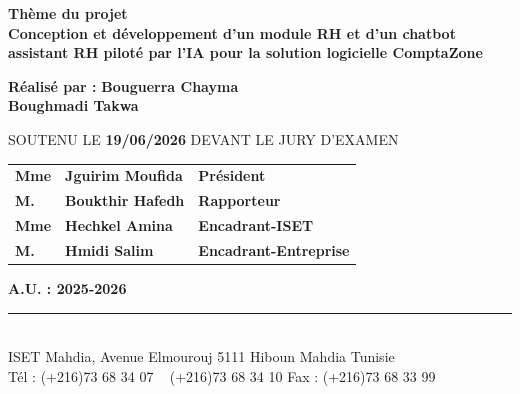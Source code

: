 \documentclass[12pt,a4paper]{report}
\begin{document}
\begin{titlepage}
   \begin{tcolorbox}[
    enhanced,
    width=\textwidth,
    colback=white,
    colframe=black,
    boxrule=0.8pt,
    arc=0pt,
    outer arc=0pt,
    borderline west={4pt}{-4pt}{black!30},
    borderline north={4pt}{-4pt}{black!30},
    left=0.8cm,
    right=0.8cm,
    top=0.4cm,
    bottom=0.4cm,
    halign=center,
]   
    {\fontsize{18}{21}\selectfont\textbf{Thème du projet}}\\[0.2cm]
    {\fontsize{12}{15}\selectfont\textbf{Conception et développement d'un module RH et d'un chatbot assistant RH piloté par l'IA pour la solution logicielle ComptaZone}}
    \end{tcolorbox}
    \vspace{0.1cm}

\begin{flushleft}
    {\fontsize{13}{16}\selectfont\textbf{Réalisé par :}} \hspace{1cm} {\fontsize{13}{16}\selectfont\textbf{Bouguerra Chayma}}\\[0.3cm]
    \hspace{4cm} {\fontsize{13}{16}\selectfont\textbf{Boughmadi Takwa}}
\end{flushleft}

\vspace{0.1cm}

    {\hspace{0.2cm} \fontsize{10}{12.5}\selectfont SOUTENU LE \textbf{19/06/2026} DEVANT LE JURY D'EXAMEN }
    \begin{flushleft}
    \begin{tabular}{@{}p{3cm} p{6.5cm} p{7cm}@{}}
        \fontsize{11}{14}\selectfont \textbf{Mme} & \fontsize{11}{14}\selectfont\textbf{Jguirim Moufida}  & \textbf{Président} \\[0.15cm]
        \fontsize{11}{14}\selectfont \textbf{M.}  & \fontsize{11}{14}\selectfont\textbf{Boukthir Hafedh}   & \textbf{Rapporteur} \\[0.15cm]
        \fontsize{11}{14}\selectfont \textbf{Mme} & \fontsize{11}{14}\selectfont\textbf{Hechkel Amina}     & \textbf{Encadrant-ISET} \\[0.15cm]
        \fontsize{11}{14}\selectfont \textbf{M.}  & \fontsize{11}{14}\selectfont\textbf{Hmidi Salim }       & \textbf{Encadrant-Entreprise} \\
    \end{tabular}
    \end{flushleft}

    \vspace{0.7cm}

    {\fontsize{10}{12}\selectfont\textbf{A.U. : 2025-2026}}

    \rule{\textwidth}{0.8pt}\\[0.2cm]
    {\tiny ISET Mahdia, Avenue Elmourouj 5111 Hiboun Mahdia Tunisie\\
    Tél : (+216)73 68 34 07 ~ (+216)73 68 34 10 \quad Fax : (+216)73 68 33 99}

\end{titlepage}
\end{document}
